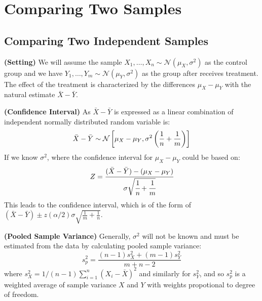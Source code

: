 \section{Comparing Two Samples}

\subsection{Comparing Two Independent Samples}

\begin{remark}{\textbf{(Setting)}}
    We will assume the sample $X_1,\dots,X_n \sim \mathcal{N}(\mu_X, \sigma^2)$ as the control group and we have $Y_1,\dots,Y_m \sim \mathcal{N}(\mu_Y, \sigma^2)$ as the group after receives treatment. The effect of the treatment is characterized by the differences $\mu_X - \mu_Y$ with the natural estimate $\bar{X}-\bar{Y}$.
\end{remark}

\begin{remark}{\textbf{(Confidence Interval)}}
    As $\bar{X}-\bar{Y}$ is expressed as a linear combination of independent normally distributed random variable is:
    \begin{equation*}
        \bar{X} - \bar{Y} \sim\mathcal{N}\left[ \mu_X - \mu_Y , \sigma^2\left( \frac{1}{n} + \frac{1}{m} \right) \right]
    \end{equation*}
    If we know $\sigma^2$, where the confidence interval for $\mu_X - \mu_Y$ could be based on:
    \begin{equation*}
        Z = \cfrac{(\bar{X} - \bar{Y}) - (\mu_X - \mu_Y)}{\sigma\sqrt{\cfrac{1}{n} + \cfrac{1}{m}}}
    \end{equation*}
    This leads to the confidence interval, which is of the form of $(\bar{X} - \bar{Y}) \pm z(\alpha/2)\sigma\sqrt{\frac{1}{m} + \frac{1}{n}}$. 
\end{remark}

\begin{definition}{\textbf{(Pooled Sample Variance)}}
    Generally, $\sigma^2$ will not be known and must be estimated from the data by calculating pooled sample variance:
    \begin{equation*}
        s_p^2 = \frac{(n-1)s_X^2 + (m-1)s_Y^2}{m+n-2}
    \end{equation*}
    where $s_X^2 = 1/(n-1)\sum^n_{i=1}(X_i - \bar{X})^2$ and similarly for $s_Y^2$, and so $s_p^2$ is a weighted average of sample variance $X$ and $Y$ with weights propotional to degree of freedom. 
\end{definition}

